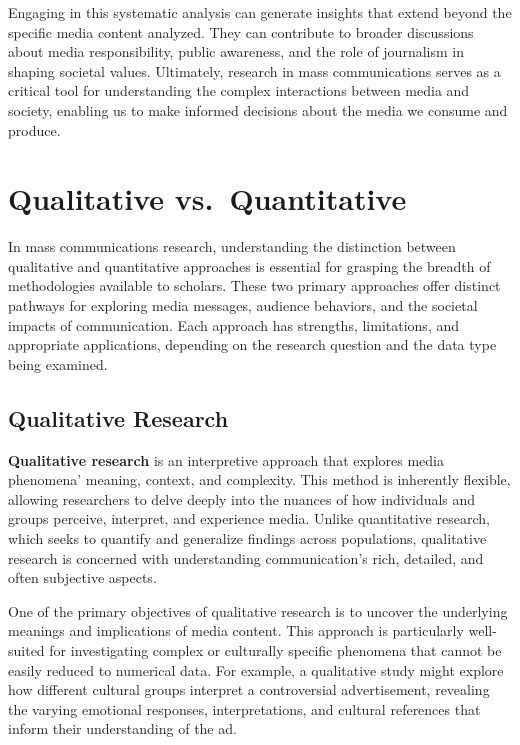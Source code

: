 \documentclass[
]{book}
\begin{document}
Engaging in this systematic analysis can generate insights that extend beyond the specific media content analyzed. They can contribute to broader discussions about media responsibility, public awareness, and the role of journalism in shaping societal values. Ultimately, research in mass communications serves as a critical tool for understanding the complex interactions between media and society, enabling us to make informed decisions about the media we consume and produce.

\section{Qualitative vs.~Quantitative}\label{qualitative-vs.-quantitative}

In mass communications research, understanding the distinction between qualitative and quantitative approaches is essential for grasping the breadth of methodologies available to scholars. These two primary approaches offer distinct pathways for exploring media messages, audience behaviors, and the societal impacts of communication. Each approach has strengths, limitations, and appropriate applications, depending on the research question and the data type being examined.

\subsection*{Qualitative Research}\label{qualitative-research}

\textbf{Qualitative research} is an interpretive approach that explores media phenomena' meaning, context, and complexity. This method is inherently flexible, allowing researchers to delve deeply into the nuances of how individuals and groups perceive, interpret, and experience media. Unlike quantitative research, which seeks to quantify and generalize findings across populations, qualitative research is concerned with understanding communication's rich, detailed, and often subjective aspects.

One of the primary objectives of qualitative research is to uncover the underlying meanings and implications of media content. This approach is particularly well-suited for investigating complex or culturally specific phenomena that cannot be easily reduced to numerical data. For example, a qualitative study might explore how different cultural groups interpret a controversial advertisement, revealing the varying emotional responses, interpretations, and cultural references that inform their understanding of the ad.
\end{document}
